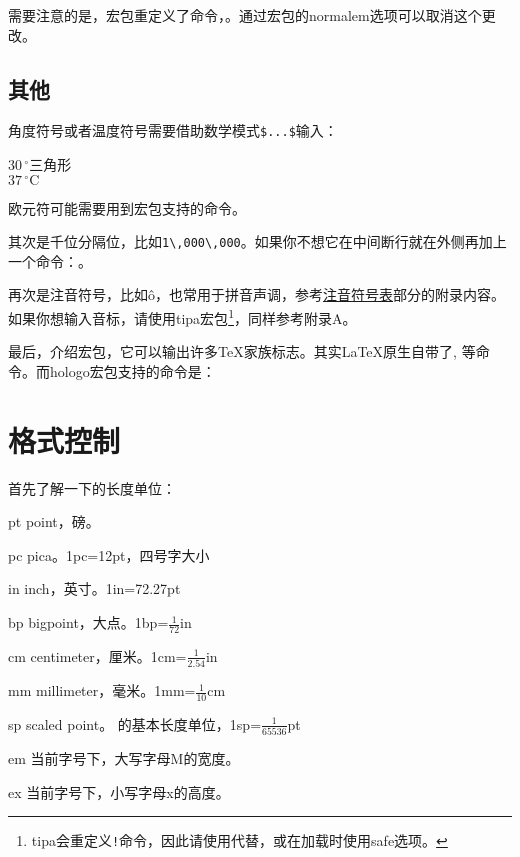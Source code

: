 需要注意的是，宏包重定义了命令，。通过宏包的normalem选项可以取消这个更改。

\subsection{其他}
角度符号或者温度符号需要借助数学模式\verb|$...$|输入：

\begin{codeshow}
$30\,^{\circ}$三角形 \\
$37\,^{\circ}\mathrm{C}$
\end{codeshow}

欧元符可能需要用到宏包支持的命令。

其次是千位分隔位，比如\verb|1\,000\,000|。如果你不想它在中间断行就在外侧再加上一个命令：。

再次是注音符号，比如\^o，也常用于拼音声调，参考\hyperref[app:phonetic]{注音符号表}部分的附录内容。如果你想输入音标，请使用tipa宏包\footnote{tipa会重定义\texttt{!}命令，因此请使用\texttt{\negthinspace}代替，或在加载时使用safe选项。}，同样参考附录A。

最后，介绍宏包，它可以输出许多\TeX 家族标志。其实\LaTeX 原生自带了, 等命令。而hologo宏包支持的命令是：

\begin{codeshow}
 
\end{codeshow}

\section{格式控制}
首先了解一下的长度单位：
\begin{fead}
  \item[pt] point，磅。\label{sec:length}
  \item[pc] pica。1pc=12pt，四号字大小
  \item[in] inch，英寸。1in=72.27pt
  \item[bp] bigpoint，大点。1bp=$\frac{1}{72}$in
  \item[cm] centimeter，厘米。1cm=$\frac{1}{2.54}$in
  \item[mm] millimeter，毫米。1mm=$\frac{1}{10}$cm
  \item[sp] scaled point。 的基本长度单位，1sp=$\frac{1}{65536}$pt
  \item[em] 当前字号下，大写字母M的宽度。
  \item[ex] 当前字号下，小写字母x的高度。
\end{fead}


